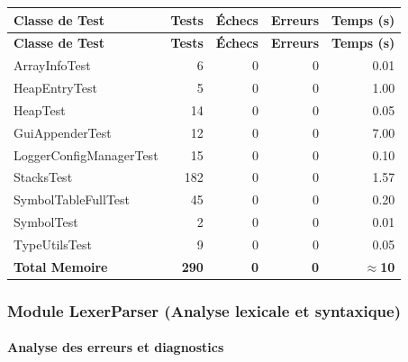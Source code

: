 \begin{center}
\small
\begin{longtable}{|l|r|r|r|r|}
\hline
\rowcolor{headerblue!20}
\textbf{Classe de Test} & \textbf{Tests} & \textbf{Échecs} & \textbf{Erreurs} & \textbf{Temps (s)} \\
\hline
\endfirsthead
\hline
\rowcolor{headerblue!20}
\textbf{Classe de Test} & \textbf{Tests} & \textbf{Échecs} & \textbf{Erreurs} & \textbf{Temps (s)} \\
\hline
\endhead
\hline
\endfoot
ArrayInfoTest & 6 & 0 & 0 & 0.01 \\
\hline
HeapEntryTest & 5 & 0 & 0 & 1.00 \\
\hline
HeapTest & 14 & 0 & 0 & 0.05 \\
\hline
GuiAppenderTest & 12 & 0 & 0 & 7.00 \\
\hline
LoggerConfigManagerTest & 15 & 0 & 0 & 0.10 \\
\hline
\rowcolor{successgreen!20}
StacksTest & 182 & 0 & 0 & 1.57 \\
\hline
SymbolTableFullTest & 45 & 0 & 0 & 0.20 \\
\hline
SymbolTest & 2 & 0 & 0 & 0.01 \\
\hline
TypeUtilsTest & 9 & 0 & 0 & 0.05 \\
\hline
\rowcolor{gray!10}
\textbf{Total Memoire} & \textbf{290} & \textbf{0} & \textbf{0} & \textbf{$\approx$10} \\
\hline
\end{longtable}
\end{center}

\subsubsection{Module LexerParser (Analyse lexicale et syntaxique)}

\paragraph{Analyse des erreurs et diagnostics}


